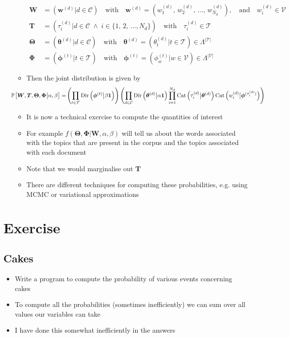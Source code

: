 \documentclass[11pt]{article}
\newcommand{\Prob}[2][]{\mathbb{P}_{#1\!}\left[ #2 \right]}
\newcommand{\Dist}[2][Binom]{\mathrm{#1}\left( \strut {#2} \right)}
\begin{document}
\begin{itemize}
\begin{itemize}
\begin{align*}
 \bm{W} &= (\bm{w}^{(d)} | d\in\mathcal{C})\quad \text{with} \quad
 \bm{w}^{(d)}=(w_1^{(d)},\, w_2^{(d)},\, \ldots,\, w_{N_d}^{(d)}),
 \quad \text{and}\quad w_i^{(d)} \in \mathcal{V} \\
  \bm{T} &= (\tau^{(d)}_i | d\in\mathcal{C}\;\wedge\;
   i\in\{1,\,2,\,\ldots, N_d\})\quad \text{with} \quad \tau^{(d)}_i \in
   \mathcal{T} \\
  \bm{\Theta} &=(\bm{\theta}^{(d)} | d\in\mathcal{C})\quad \text{with}
   \quad \bm{\theta}^{(d)} = (\theta^{(d)}_t | t \in \mathcal{T})\in
  \Lambda^{|\mathcal{T}|} \\
  \bm{\Phi} &= (\bm{\phi}^{(t)} | t \in \mathcal{T}) \quad \text{with}
 \quad \bm{\phi}^{(t)} = (\phi^{(t)}_w | w \in \mathcal{V}) \in
 \Lambda^{|\mathcal{V}|}
\end{align*}
\item Then the joint distribution is given by
\begin{align*}
\hspace{-1cm}        \Prob{\bm{W},\bm{T},\bm{\Theta},\bm{\Phi}\big|\alpha,\beta} =
 & \left(\prod_{t\in\mathcal{T}} \Dist[Dir]{\bm{\phi}^{(t)}\big|\beta\bm{1}}\right)
  \Biggl(\prod_{d\in\mathcal{C}} \Dist[Dir]{\bm{\theta}^{(d)}\big|\alpha\bm{1}}
  \prod_{i=1}^{N_d} \Dist[Cat]{\tau_i^{(d)}\big| \bm{\theta}^{(d)}}
  \Dist[Cat]{w_i^{(d)} \big| \bm{\phi}^{(\tau_i^{(d)})}}\Biggr)
  \end{align*}
\item It is now a technical exercise to compute the quantities of interest
\item For example \(f(\bm{\Theta},\bm{\Phi}|\bm{W},\alpha,\beta)\) will
tell us about the words associated with the topics that are
present in the corpus and the topics associated with each document
\item Note that we would marginalise out \(\bm{T}\)
\item There are different techniques for computing these
probabilities, e.g. using MCMC or variational approximations
\end{itemize}
\end{itemize}



\section{Exercise}
\label{sec:org74214ff}

\subsection{Cakes \label{sec:exCakes}}
\label{sec:org0e8413b}
\begin{itemize}
\item Write a program to compute the probability of various events
concerning cakes
\item To compute all the probabilities (sometimes inefficiently) we can
sum over all values our variables can take
\item I have done this somewhat inefficiently in the answers
\end{itemize}
\end{document}
